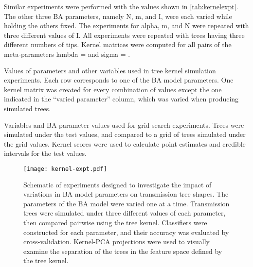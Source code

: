 Similar experiments were performed with the values shown in
\cref{tab:kernelexpt}. The other three \gls{BA} parameters, namely \gls{N},
\gls{m}, and \gls{I}, were each varied while holding the others fixed. The
experiments for \gls{alpha}, \gls{m}, and \gls{N} were repeated with three
different values of \gls{I}. All experiments were repeated with trees having
three different numbers of tips. Kernel matrices were computed for all pairs of
the meta-parameters \gls{lambda} =  and \gls{sigma} =
.

\begin{landscape}
\begin{table}[ht]
  \centering
  
  \caption[Variables used in tree kernel simulation experiments]
  {
    Values of parameters and other variables used in tree kernel simulation
    experiments. Each row corresponds to one of the \gls{BA} model parameters.
    One kernel matrix was created for every combination of values except the
    one indicated in the ``varied parameter'' column, which was varied when
    producing simulated trees.
  }
  \label{tab:kernelexpt}
\end{table}

\begin{table}[ht]
  \centering
  
  \caption[Variables used in grid search experiments]
  {
    Variables and \gls{BA} parameter values used for grid search experiments. 
    Trees were simulated under the test values, and compared to a grid of trees
    simulated under the grid values. Kernel scores were used to calculate point
    estimates and credible intervals for the test values.
  }
  \label{tab:gridexpt}
\end{table}
\end{landscape}

\begin{figure}[ht]
  \centering
  \texttt{[image: kernel-expt.pdf]}
  \caption[Schematic of experiments investigating impact of BA model parameters
           on tree shape.]{
    Schematic of experiments designed to investigate the impact of variations
    in BA model parameters on transmission tree shapes. The parameters of the
    BA model were varied one at a time. Transmission trees were simulated under
    three different values of each parameter, then compared pairwise using the
    tree kernel. Classifiers were constructed for each parameter, and their
    accuracy was evaluated by cross-validation. Kernel-PCA projections were
    used to visually examine the separation of the trees in the feature space
    defined by the tree kernel.
  }
  \label{fig:kernelexpt}
\end{figure}

